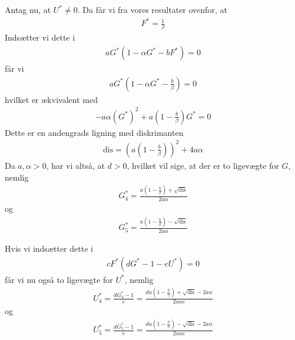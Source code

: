 \documentclass[12pt]{article}
\begin{document}
Antag nu, at $U^*\neq 0$. Da får vi fra vores resultater ovenfor, at
\begin{align}
F^* = \frac{1}{\beta}
\end{align}
Indsætter vi dette i 
\begin{align}
aG^*(1 - \alpha G^* - bF^*) = 0
\end{align}
får vi 
\begin{align}
aG^*\left(1 - \alpha G^* - \frac{b}{\beta}\right) = 0
\end{align}
hvilket er ækvivalent med 
\begin{align}
-a\alpha (G^*)^2 + a \left( 1 - \frac{b}{\beta} \right) G^* = 0
\end{align}
Dette er en andengrads ligning med diskrimanten
\begin{align}
\text{dis} = \left(a \left( 1 - \frac{b}{\beta} \right) \right)^2 + 4a\alpha
\end{align}
Da $a, \alpha > 0$, har vi altså, at $d>0$, hvilket vil sige, at der er to ligevægte for $G$, nemlig
\begin{align}
G_4^* = \frac{a \left( 1 - \frac{b}{\beta} \right)  + \sqrt{\text{dis}}}{2a\alpha} 
\end{align}
og
\begin{align}
G_5^* = \frac{a \left( 1 - \frac{b}{\beta} \right) - \sqrt{\text{dis}}}{2a\alpha} 
\end{align}

Hvis vi indsætter dette i 
\begin{align}
cF^*(dG^* - 1 - eU^*) = 0
\end{align}
får vi nu også to ligevægte for $U^*$, nemlig
\begin{align}
U_4^* = \frac{dG_4^* - 1}{e} = 
\frac{d a \left( 1 - \frac{b}{\beta} \right)  + \sqrt{\text{dis}} - 2a\alpha}{2a\alpha e}
\end{align}
og 
\begin{align}
U_5^* = \frac{dG_5^* - 1}{e} = 
\frac{d a \left( 1 - \frac{b}{\beta} \right)  - \sqrt{\text{dis}} - 2a\alpha}{2a\alpha e}
\end{align}
\end{document}
